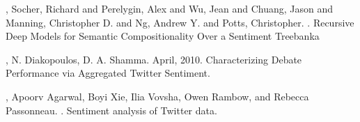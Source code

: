%
%


\begin{thebibliography}{}

%
%
%
%


,
Socher, Richard  and  Perelygin, Alex  and  Wu, Jean  and  Chuang, Jason  and  Manning, Christopher D.  and  Ng, Andrew Y.  and  Potts, Christopher. 
. 
\newblock Recursive Deep Models for Semantic Compositionality Over a Sentiment Treebanka

,
N. Diakopoulos, D. A. Shamma. 
\newblock April, 2010.
\newblock Characterizing Debate Performance via Aggregated Twitter Sentiment.

,
Apoorv Agarwal, Boyi Xie, Ilia Vovsha, Owen Rambow, and Rebecca Passonneau. 
. 
\newblock Sentiment analysis of Twitter data. 

\end{thebibliography}











